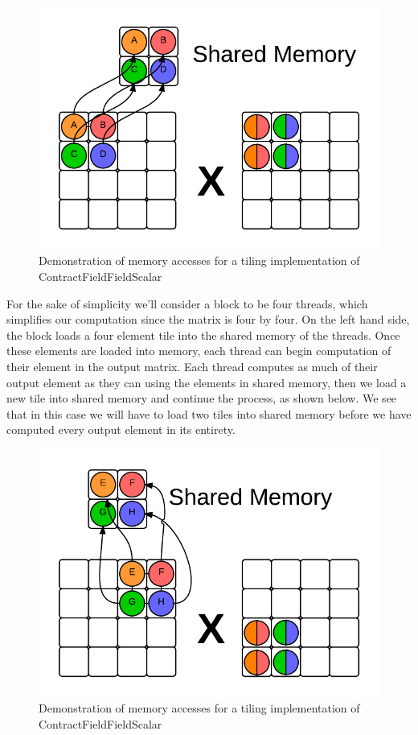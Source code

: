 \begin{figure}
    \centering
    \includegraphics[scale = .7]{ContractFieldFieldScalarGraphicTiling}
    \caption{Demonstration of memory accesses for a tiling implementation of ContractFieldFieldScalar}
\end{figure}

For the sake of simplicity we'll consider a block to be four threads, which simplifies our computation since the matrix is four by four. On the left hand side, the block loads a four element tile into the shared memory of the threads. Once these elements are loaded into memory, each thread can begin computation of their element in the output matrix. Each thread computes as much of their output element as they can using the elements in shared memory, then we load a new tile into shared memory and continue the process, as shown below. We see that in this case we will have to load two tiles into shared memory before we have computed every output element in its entirety. 

\begin{figure}
    \centering
    \includegraphics[scale = .7]{ContractFieldFieldScalarGraphicTiling2}
    \caption{Demonstration of memory accesses for a tiling implementation of ContractFieldFieldScalar}
\end{figure}

